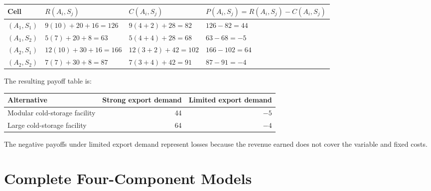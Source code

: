 \begin{center}
	\small
	\begin{tabular}{llll}
		\toprule
		Cell
		& \(R(A_i,S_j)\)
		& \(C(A_i,S_j)\)
		& \(P(A_i,S_j)=R(A_i,S_j)-C(A_i,S_j)\) \\
		\midrule
		\((A_1,S_1)\)
		& \(9(10)+20+16=126\)
		& \(9(4+2)+28=82\)
		& \(126-82=44\) \\
		
		\((A_1,S_2)\)
		& \(5(7)+20+8=63\)
		& \(5(4+4)+28=68\)
		& \(63-68=-5\) \\
		
		\((A_2,S_1)\)
		& \(12(10)+30+16=166\)
		& \(12(3+2)+42=102\)
		& \(166-102=64\) \\
		
		\((A_2,S_2)\)
		& \(7(7)+30+8=87\)
		& \(7(3+4)+42=91\)
		& \(87-91=-4\) \\
		\bottomrule
	\end{tabular}
\end{center}

The resulting payoff table is:

\begin{center}
	\begin{tabular}{lrr}
		\toprule
		Alternative & Strong export demand & Limited export demand \\
		\midrule
		Modular cold-storage facility & 44 & \(-5\) \\
		Large cold-storage facility & 64 & \(-4\) \\
		\bottomrule
	\end{tabular}
\end{center}

The negative payoffs under limited export demand represent losses because
the revenue earned does not cover the variable and fixed costs.


\section{Complete Four-Component Models}
\label{sec:complete-models}


